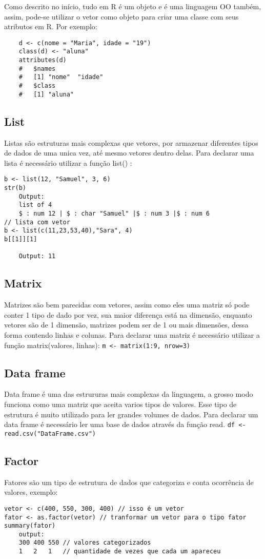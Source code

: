 \documentclass[12pt]{article}
\begin{document}
Como descrito no início, tudo em R é um objeto e é uma linguagem OO também, assim, pode-se utilizar o vetor como objeto para criar uma classe com seus atributos em R. Por exemplo:

    \begin{verbatim}
    d <- c(nome = "Maria", idade = "19") 
    class(d) <- "aluna"
    attributes(d)
    #   $names
    #   [1] "nome"  "idade"
    #   $class
    #   [1] "aluna"
    \end{verbatim}

\subsection{List}
Listas são estruturas mais complexas que vetores, por armazenar diferentes tipos de dados de uma unica vez, até mesmo vetores dentro delas.
    Para declarar uma lista é necessário utilizar a função list() :
\begin{verbatim}
b <- list(12, "Samuel", 3, 6)
str(b)
    Output:
    list of 4
    $ : num 12 | $ : char "Samuel" |$ : num 3 |$ : num 6
// lista com vetor
b <- list(c(11,23,53,40),"Sara", 4)
b[[1]][1]

    Output: 11
\end{verbatim}

\subsection{Matrix}
    Matrizes são bem parecidas com vetores, assim como eles uma matriz só pode conter 1 tipo de dado por vez, sua maior diferença está na dimensão, enquanto vetores são de 1 dimensão, matrizes podem ser de 1 ou mais dimensões, dessa forma contendo linhas e colunas.
    Para declarar uma matriz é necessário utilizar a função matrix(valores, linhas): \texttt{m <- matrix(1:9, nrow=3)}
    
\subsection{Data frame}
    Data frame é uma das estrururas mais complexas da linguagem, a grosso modo funciona como uma matriz que aceita varios tipos de valores. Esse tipo de estrutura é muito utilizado para ler grandes volumes de dados. Para declarar um data frame é necessário ler uma base de dados através da função read. \texttt{df <- read.csv("DataFrame.csv")}


\subsection{Factor}
 Fatores são um tipo de estrutura de dados que categoriza e conta ocorrência de valores, exemplo:
 \begin{verbatim}
vetor <- c(400, 550, 300, 400) // isso é um vetor
fator <- as.factor(vetor) // tranformar um vetor para o tipo fator
summary(fator)
    output:
    300 400 550 // valores categorizados
    1   2   1   // quantidade de vezes que cada um apareceu
 \end{verbatim}
\end{document}
